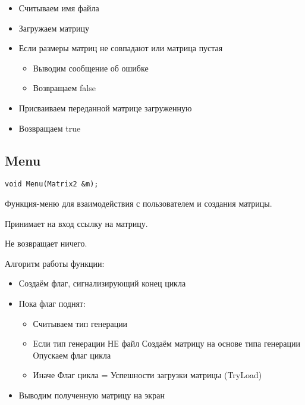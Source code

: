 \begin{itemize}
	\item Считываем имя файла
	\item Загружаем матрицу
	\item Если размеры матриц не совпадают или матрица пустая
	\begin{itemize}
		\item Выводим сообщение об ошибке
		\item Возвращаем false
	\end{itemize}
	\item Присваиваем переданной матрице загруженную
	\item Возвращаем true
\end{itemize}

\subsection*{Menu}

\begin{lstlisting}[label={lst:Menu}]
	void Menu(Matrix2 &m);
\end{lstlisting}

Функция-меню для взаимодействия с пользователем и создания матрицы.

Принимает на вход ссылку на матрицу.

Не возвращает ничего.

Алгоритм работы функции:

\begin{itemize}
	\item Создаём флаг, сигнализирующий конец цикла
	\item Пока флаг поднят:
	\begin{itemize}
		  \item Считываем тип генерации
		  \item Если тип генерации НЕ файл
		  \subitem Создаём матрицу на основе типа генерации
		  \subitem Опускаем флаг цикла
		  \item Иначе
		  \subitem Флаг цикла = Успешности загрузки матрицы (TryLoad)
	\end{itemize}
	\item Выводим полученную матрицу на экран
\end{itemize}